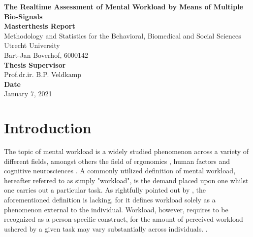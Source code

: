 \documentclass[12pt]{article}
\begin{document}
\begin{titlepage}
\begin{center}
\LARGE{\textbf{The Realtime Assessment of Mental Workload by Means of Multiple Bio-Signals}}\\
\vspace*{2\baselineskip}
\Large{\textbf{Masterthesis Report}}\\
Methodology and Statistics for the Behavioral, Biomedical and Social Sciences\\
\vspace*{1\baselineskip}
Utrecht University\\
\vspace*{4\baselineskip}
{Bart-Jan Boverhof, 6000142}\\
\vspace*{1\baselineskip}
{\textbf{Thesis Supervisor}}\\
Prof.dr.ir. B.P. Veldkamp\\
\vspace*{1\baselineskip}
{\textbf{Date}}\\
January 7, 2021\\
\vspace*{1\baselineskip}
\end{center}
\end{titlepage}

\section{Introduction}
The topic of mental workload is a widely studied phenomenon across a variety of different fields, amongst others the field of ergonomics \cite{young2015state}, human factors \cite{pretorius2007development} and cognitive neurosciences \cite{shuggi2017mental}. A commonly utilized definition of mental workload, hereafter referred to as simply "workload", is the demand placed upon one whilst one carries out a particular task. As rightfully pointed out by , the aforementioned definition is lacking, for it defines workload solely as a phenomenon external to the individual. Workload, however, requires to be recognized as a person-specific construct, for the amount of perceived workload ushered by a given task may vary substantially across individuals. \cite{de1996measurement}. 
\end{document}
